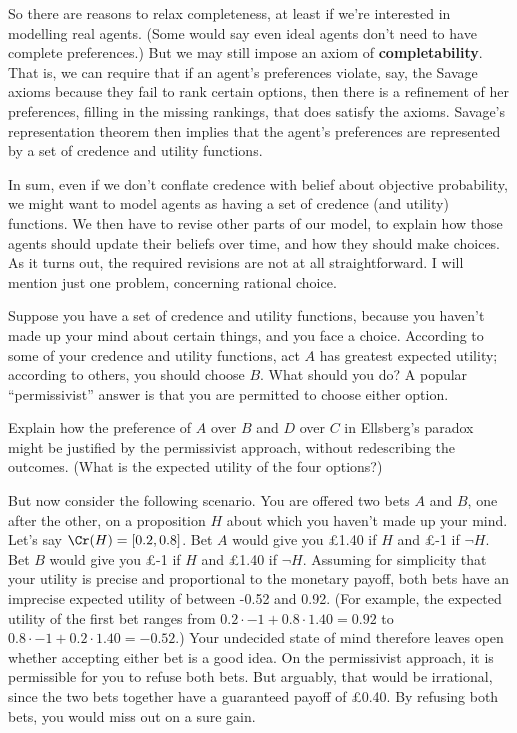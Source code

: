 

So there are reasons to relax completeness, at least if we're
interested in modelling real agents. (Some would say even ideal
agents don't need to have complete preferences.) But we may still
impose an axiom of \textbf{completability}. That is, we can require
that if an agent's preferences violate, say, the Savage axioms because
they fail to rank certain options, then there is a refinement of her
preferences, filling in the missing rankings, that does satisfy the
axioms. Savage's representation theorem then implies that the agent's
preferences are represented by a set of credence and utility
functions.

In sum, even if we don't conflate credence with belief about objective
probability, we might want to model agents as having a set of credence
(and utility) functions. We then have to revise other parts of our
model, to explain how those agents should update their beliefs over
time, and how they should make choices. As it turns out, the required
revisions are not at all straightforward. I will mention just one
problem, concerning rational choice. 

Suppose you have a set of credence and utility functions, because you
haven't made up your mind about certain things, and you face a
choice. According to some of your credence and utility functions, act
$A$ has greatest expected utility; according to others, you should
choose $B$. What should you do? A popular ``permissivist'' answer is
that you are permitted to choose either option.

\begin{exercise}{2}
  Explain how the preference of $A$ over $B$ and $D$ over $C$ in
  Ellsberg's paradox might be justified by the permissivist approach,
  without redescribing the outcomes. (What is the expected utility of
  the four options?) 
\end{exercise}

But now consider the following scenario. You are offered two bets $A$
and $B$, one after the other, on a proposition $H$ about which you
haven't made up your mind. Let's say $\Cr(H) = [0.2,0.8]$. Bet $A$
would give you £1.40 if $H$ and £-1 if $\neg H$. Bet $B$ would give
you £-1 if $H$ and £1.40 if $\neg H$. Assuming for simplicity that
your utility is precise and proportional to the monetary payoff, both
bets have an imprecise expected utility of between -0.52 and
0.92. (For example, the expected utility of the first bet ranges from
$0.2 \cdot -1 + 0.8 \cdot 1.40 = 0.92$ to $0.8 \cdot -1 + 0.2 \cdot
1.40 = -0.52$.) Your undecided state of mind therefore leaves open
whether accepting either bet is a good idea. On the permissivist
approach, it is permissible for you to refuse both bets. But
arguably, that would be irrational, since the two bets together have a
guaranteed payoff of £0.40. By refusing both bets, you would miss out
on a sure gain.


